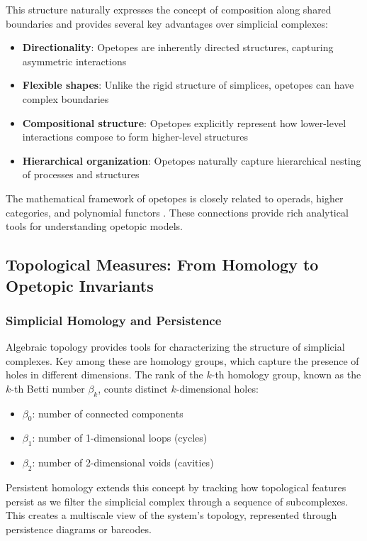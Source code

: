 This structure naturally expresses the concept of composition along shared boundaries and provides several key advantages over simplicial complexes:

\begin{itemize}
    \item \textbf{Directionality}: Opetopes are inherently directed structures, capturing asymmetric interactions
    \item \textbf{Flexible shapes}: Unlike the rigid structure of simplices, opetopes can have complex boundaries
    \item \textbf{Compositional structure}: Opetopes explicitly represent how lower-level interactions compose to form higher-level structures
    \item \textbf{Hierarchical organization}: Opetopes naturally capture hierarchical nesting of processes and structures
\end{itemize}

The mathematical framework of opetopes is closely related to operads, higher categories, and polynomial functors \citep{baez2020network, leinster2004higher}. These connections provide rich analytical tools for understanding opetopic models.

\subsection{Topological Measures: From Homology to Opetopic Invariants}
\subsubsection{Simplicial Homology and Persistence}
Algebraic topology provides tools for characterizing the structure of simplicial complexes. Key among these are homology groups, which capture the presence of holes in different dimensions. The rank of the $k$-th homology group, known as the $k$-th Betti number $\beta_k$, counts distinct $k$-dimensional holes:
\begin{itemize}
    \item $\beta_0$: number of connected components
    \item $\beta_1$: number of 1-dimensional loops (cycles)
    \item $\beta_2$: number of 2-dimensional voids (cavities)
\end{itemize}

Persistent homology extends this concept by tracking how topological features persist as we filter the simplicial complex through a sequence of subcomplexes. This creates a multiscale view of the system's topology, represented through persistence diagrams or barcodes.

